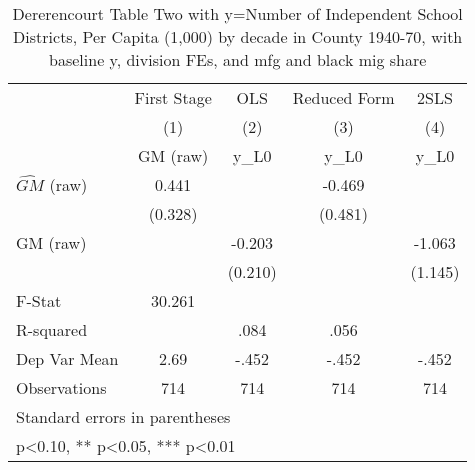 \begin{table}[htbp]\centering
\def\sym#1{\ifmmode^{#1}\else\(^{#1}\)\fi}
\caption{Dererencourt Table Two with y=Number of Independent School Districts, Per Capita (1,000) by decade in County 1940-70, with baseline y, division FEs, and mfg and black mig share}
\begin{tabular}{l*{4}{c}}
\toprule
                    & First Stage   &         OLS   &Reduced Form   &        2SLS   \\
                    &\multicolumn{1}{c}{(1)}&\multicolumn{1}{c}{(2)}&\multicolumn{1}{c}{(3)}&\multicolumn{1}{c}{(4)}\\
                    &\multicolumn{1}{c}{GM  (raw)}&\multicolumn{1}{c}{y\_L0}&\multicolumn{1}{c}{y\_L0}&\multicolumn{1}{c}{y\_L0}\\
\midrule
$\hat{GM}$ (raw)    &       0.441   &               &      -0.469   &               \\
                    &     (0.328)   &               &     (0.481)   &               \\
\addlinespace
GM  (raw)           &               &      -0.203   &               &      -1.063   \\
                    &               &     (0.210)   &               &     (1.145)   \\
\midrule
F-Stat              &      30.261   &               &               &               \\
R-squared           &               &        .084   &        .056   &               \\
Dep Var Mean        &        2.69   &       -.452   &       -.452   &       -.452   \\
Observations        &         714   &         714   &         714   &         714   \\
\bottomrule
\multicolumn{5}{l}{\footnotesize Standard errors in parentheses}\\
\multicolumn{5}{l}{\footnotesize * p<0.10, ** p<0.05, *** p<0.01}\\
\end{tabular}
\end{table}
